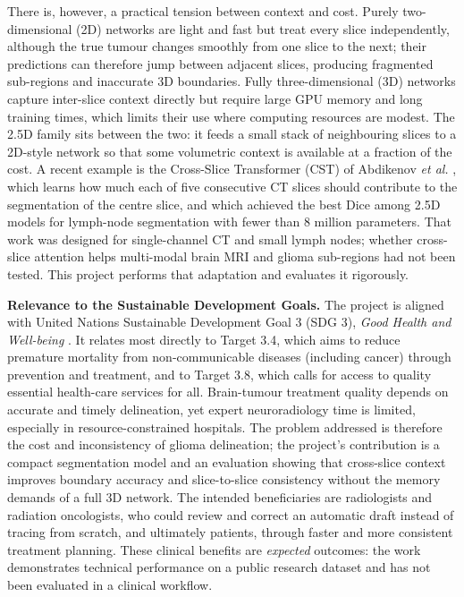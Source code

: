 There is, however, a practical tension between context and cost. Purely two-dimensional (2D) networks are light and fast but treat every slice independently, although the true tumour changes smoothly from one slice to the next; their predictions can therefore jump between adjacent slices, producing fragmented sub-regions and inaccurate 3D boundaries. Fully three-dimensional (3D) networks capture inter-slice context directly but require large GPU memory and long training times, which limits their use where computing resources are modest. The 2.5D family sits between the two: it feeds a small stack of neighbouring slices to a 2D-style network so that some volumetric context is available at a fraction of the cost. A recent example is the Cross-Slice Transformer (CST) of Abdikenov \emph{et al.} \cite{abdikenov2026}, which learns how much each of five consecutive CT slices should contribute to the segmentation of the centre slice, and which achieved the best Dice among 2.5D models for lymph-node segmentation with fewer than 8 million parameters. That work was designed for single-channel CT and small lymph nodes; whether cross-slice attention helps multi-modal brain MRI and glioma sub-regions had not been tested. This project performs that adaptation and evaluates it rigorously.

\textbf{Relevance to the Sustainable Development Goals.} The project is aligned with United Nations Sustainable Development Goal 3 (SDG 3), \emph{Good Health and Well-being} \cite{un2015sdg}. It relates most directly to Target 3.4, which aims to reduce premature mortality from non-communicable diseases (including cancer) through prevention and treatment, and to Target 3.8, which calls for access to quality essential health-care services for all. Brain-tumour treatment quality depends on accurate and timely delineation, yet expert neuroradiology time is limited, especially in resource-constrained hospitals. The problem addressed is therefore the cost and inconsistency of glioma delineation; the project's contribution is a compact segmentation model and an evaluation showing that cross-slice context improves boundary accuracy and slice-to-slice consistency without the memory demands of a full 3D network. The intended beneficiaries are radiologists and radiation oncologists, who could review and correct an automatic draft instead of tracing from scratch, and ultimately patients, through faster and more consistent treatment planning. These clinical benefits are \emph{expected} outcomes: the work demonstrates technical performance on a public research dataset and has not been evaluated in a clinical workflow.

